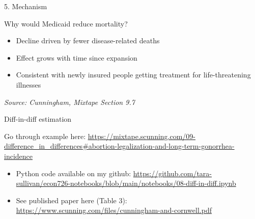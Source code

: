 \documentclass[compress, 8pt]{beamer}
\begin{document}
\begin{frame}{5. Mechanism}

Why would Medicaid reduce mortality?
\begin{itemize}
    \item Decline driven by fewer disease-related deaths
    \item Effect grows with time since expansion
    \item Consistent with newly insured people getting treatment for life-threatening illnesses
\end{itemize}

\emph{Source: Cunningham, Mixtape Section 9.7}
\end{frame}

\begin{frame}{Diff-in-diff estimation}

Go through example here: \url{https://mixtape.scunning.com/09-difference_in_differences\#abortion-legalization-and-long-term-gonorrhea-incidence}
\begin{itemize}
    \item Python code available on my github: \url{https://github.com/tara-sullivan/econ726-notebooks/blob/main/notebooks/08-diff-in-diff.ipynb}
    \item See published paper here (Table 3): \url{https://www.scunning.com/files/cunningham-and-cornwell.pdf}
\end{itemize}

\end{frame}
\end{document}
